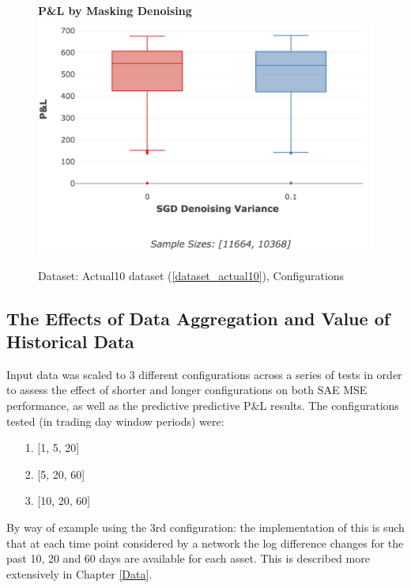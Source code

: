 \documentclass[a4paper,11pt,oneside]{article}
\theoremstyle{plain}
\theoremstyle{definition}
\begin{document}
\begin{figure}[H]
	\textbf{P\&L by Masking Denoising}
	\centering
	\includegraphics[scale=0.35]{images/results/network/denoising/actual_pl_masking.png}
	\caption{Dataset: Actual10 dataset (\ref{dataset_actual10}), Configurations
		\newline }
	\label{figure-actual_pl_masking}
\end{figure}



\newpage
\subsection{The Effects of Data Aggregation and Value of Historical Data}

Input data was scaled to 3 different configurations across a series of tests in order to assess the effect of shorter and longer configurations on both SAE MSE performance, as well as the predictive predictive P\&L results. The configurations tested (in trading day window periods) were:

\begin{itemize}
	\item[1.] [1, 5, 20]
	\item[2.] [5, 20, 60]
	\item[3.] [10, 20, 60]
\end{itemize}

By way of example using the 3rd configuration: the implementation of this is such that at each time point considered by a network the log difference changes for the past 10, 20 and 60 days are available for each asset. This is described more extensively in Chapter \ref{Data}.\newline
\end{document}
